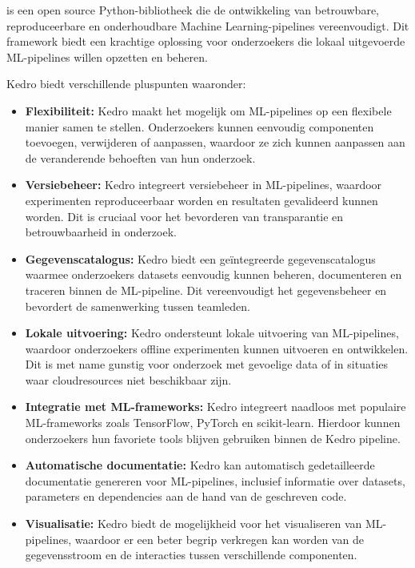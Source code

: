 \textcite{Kedro2024} is een open source Python-bibliotheek die de ontwikkeling van betrouwbare, reproduceerbare en onderhoudbare Machine Learning-pipelines vereenvoudigt. Dit framework biedt een krachtige oplossing voor onderzoekers die lokaal uitgevoerde ML-pipelines willen opzetten en beheren.

Kedro biedt verschillende pluspunten waaronder:

\begin{itemize}
    \item \textbf{Flexibiliteit:} Kedro maakt het mogelijk om ML-pipelines op een flexibele manier samen te stellen. Onderzoekers kunnen eenvoudig componenten toevoegen, verwijderen of aanpassen, waardoor ze zich kunnen aanpassen aan de veranderende behoeften van hun onderzoek.
    \item \textbf{Versiebeheer:} Kedro integreert versiebeheer in ML-pipelines, waardoor experimenten reproduceerbaar worden en resultaten gevalideerd kunnen worden. Dit is cruciaal voor het bevorderen van transparantie en betrouwbaarheid in onderzoek.
    \item \textbf{Gegevenscatalogus:} Kedro biedt een geïntegreerde gegevenscatalogus waarmee onderzoekers datasets eenvoudig kunnen beheren, documenteren en traceren binnen de ML-pipeline. Dit vereenvoudigt het gegevensbeheer en bevordert de samenwerking tussen teamleden.
    \item \textbf{Lokale uitvoering:} Kedro ondersteunt lokale uitvoering van ML-pipelines, waardoor onderzoekers offline experimenten kunnen uitvoeren en ontwikkelen. Dit is met name gunstig voor onderzoek met gevoelige data of in situaties waar cloudresources niet beschikbaar zijn.
    \item \textbf{Integratie met ML-frameworks:} Kedro integreert naadloos met populaire ML-frameworks zoals TensorFlow, PyTorch en scikit-learn. Hierdoor kunnen onderzoekers hun favoriete tools blijven gebruiken binnen de Kedro pipeline.
    \item \textbf{Automatische documentatie:} Kedro kan automatisch gedetailleerde documentatie genereren voor ML-pipelines, inclusief informatie over datasets, parameters en dependencies aan de hand van de geschreven code.
    \item \textbf{Visualisatie:} Kedro biedt de mogelijkheid voor het visualiseren van ML-pipelines, waardoor er een beter begrip verkregen kan worden van de gegevensstroom en de interacties tussen verschillende componenten.
\end{itemize}

